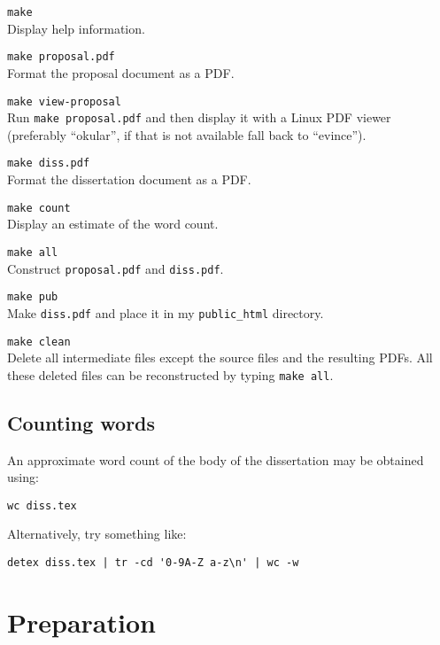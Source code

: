 \documentclass[12pt,a4paper,twoside,openright, hidelinks]{report}
\begin{document}
\begin{description}

\item\texttt{make} \\
 Display help information.

\item\texttt{make proposal.pdf} \\
 Format the proposal document as a PDF.

\item\texttt{make view-proposal} \\
 Run \texttt{make proposal.pdf} and then display it with a Linux PDF viewer
 (preferably ``okular'', if that is not available fall back to ``evince'').

\item\texttt{make diss.pdf} \\
 Format the dissertation document as a PDF.

\item\texttt{make count} \\
Display an estimate of the word count.

\item\texttt{make all} \\
Construct \texttt{proposal.pdf} and \texttt{diss.pdf}.

\item\texttt{make pub} \\ Make \texttt{diss.pdf}
and place it in my \texttt{public\_html} directory.

\item\texttt{make clean} \\ Delete all intermediate files except the
source files and the resulting PDFs. All these deleted files can
be reconstructed by typing \texttt{make all}.

\end{description}


\section{Counting words}

An approximate word count of the body of the dissertation may be
obtained using:

\texttt{wc diss.tex}

\noindent
Alternatively, try something like:

\verb/detex diss.tex | tr -cd '0-9A-Z a-z\n' | wc -w/


\chapter{Preparation}
\end{document}
